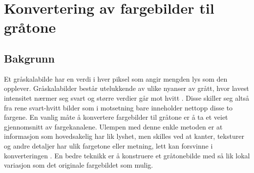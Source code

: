 \newpage
\section{Konvertering av fargebilder til gråtone}
\label{sec:gråtone}
\subsection{Bakgrunn}
Et gråskalabilde har en  verdi i hver piksel som angir mengden lys som den opplever. Gråskalabilder består utelukkende av ulike nyanser av grått, hvor lavest intensitet nærmer seg svart og større verdier går mot hvitt \cite{wiki:grayscale}. Disse skiller seg altså fra rene svart-hvitt bilder som i motsetning bare inneholder nettopp disse to fargene. En vanlig måte å konvertere fargebilder til gråtone er å ta et veiet gjennomsnitt av fargekanalene. Ulempen med denne enkle metoden er at informasjon som hovedsakelig har lik lyshet, men skilles ved at kanter, teksturer og andre detaljer har ulik fargetone eller metning, lett kan forsvinne i konverteringen \cite{prosjekt}.
\newline En bedre teknikk er å konstruere et gråtonebilde med så lik lokal variasjon som det originale fargebildet som mulig. 

